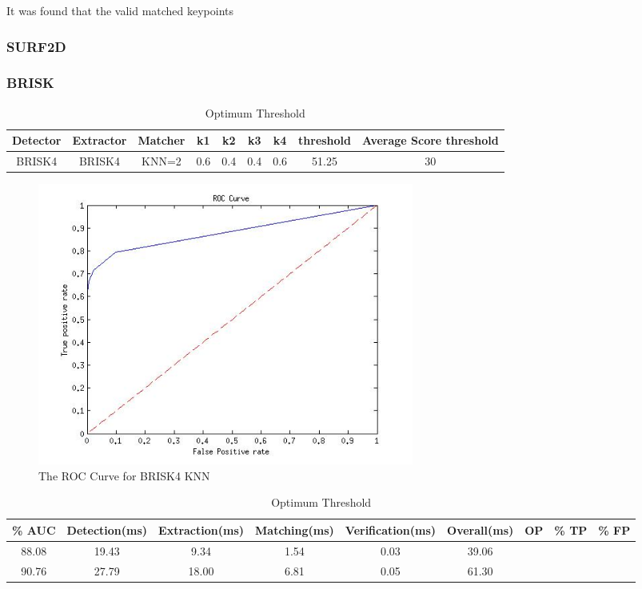 \documentclass{article}
\begin{document}

It was found that the valid matched keypoints


\subsubsection{SURF2D}
\label{sec:2dsurfResults}

\subsubsection{BRISK}
\label{sec:briskResults}
\begin{table}
\caption{Optimum Threshold}
\begin{tabular}{|c|c|c|c|c|c|c|c|c|}
\hline 
Detector & Extractor & Matcher & k1 & k2 & k3 & k4 & threshold & Average Score threshold\tabularnewline
\hline 
\hline 
BRISK4 & BRISK4 & KNN=2 & 0.6 & 0.4 & 0.4 & 0.6 & 51.25 & 30\tabularnewline
\hline 
\end{tabular}
\label{tab:sbrisk}
\end{table}

\begin{figure}[h!]
	\centering
		\includegraphics[width=0.6\textwidth]{../Drawings/ROC_BRISK4_BRISK4_KNN.jpg}
	\caption{The ROC Curve for BRISK4 KNN}
	\label{fig:sbriskroc}
\end{figure}

\begin{table}
\caption{Optimum Threshold}
\begin{tabular}{|c|c|c|c|c|c|c|c|c|}
\hline 
\% AUC & Detection(ms) & Extraction(ms) & Matching(ms) & Verification(ms) & Overall(ms) & OP & \% TP & \% FP\tabularnewline
\hline 
\hline 
88.08 & 19.43 & 9.34 & 1.54 & 0.03 & 39.06 &  &  & \tabularnewline
\hline 
90.76 & 27.79 & 18.00 & 6.81 & 0.05 & 61.30 &  &  & \tabularnewline
\hline 
\end{tabular}
\label{tab:sbrisk}
\end{table}
\end{document}
